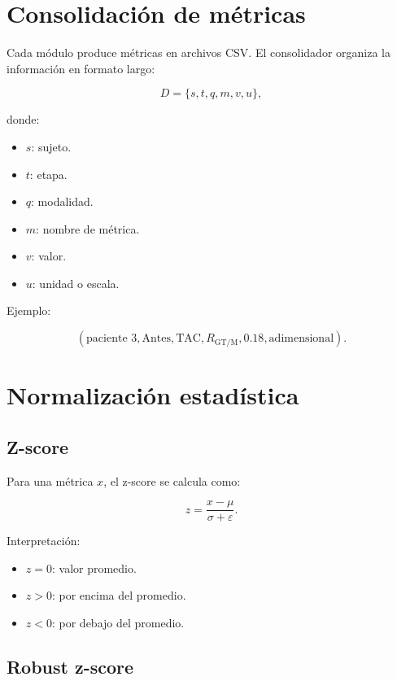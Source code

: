 \documentclass[12pt,a4paper]{article}
\begin{document}
\section{Consolidación de métricas}

Cada módulo produce métricas en archivos CSV. El consolidador organiza la información en formato largo:

\[
D =
\{s,t,q,m,v,u\},
\]

donde:

\begin{itemize}
    \item \(s\): sujeto.
    \item \(t\): etapa.
    \item \(q\): modalidad.
    \item \(m\): nombre de métrica.
    \item \(v\): valor.
    \item \(u\): unidad o escala.
\end{itemize}

Ejemplo:

\[
(\text{paciente 3},\text{Antes},\text{TAC},
R_{\text{GT/M}},0.18,\text{adimensional}).
\]

\section{Normalización estadística}

\subsection{Z-score}

Para una métrica \(x\), el z-score se calcula como:

\[
z =
\frac{x-\mu}{\sigma+\varepsilon}.
\]

Interpretación:

\begin{itemize}
    \item \(z=0\): valor promedio.
    \item \(z>0\): por encima del promedio.
    \item \(z<0\): por debajo del promedio.
\end{itemize}

\subsection{Robust z-score}
\end{document}
